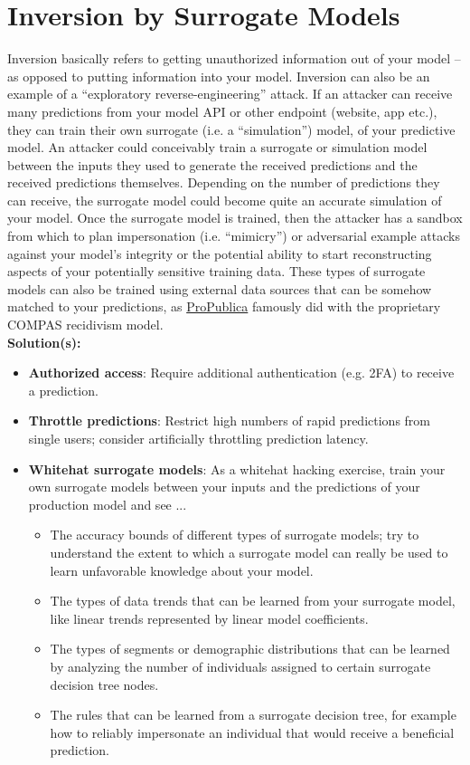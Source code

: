 \documentclass[fleqn]{article}
\begin{document}
\section{Inversion by Surrogate Models} \label{sec:inv}

Inversion basically refers to getting unauthorized information out of your model -- as opposed to putting information into your model. Inversion can also be an example of a ``exploratory reverse-engineering'' attack. If an attacker can receive many predictions from your model API or other endpoint (website, app etc.), they can train their own surrogate (i.e. a ``simulation'') model, of your predictive model. An attacker could conceivably train a surrogate or simulation model between the inputs they used to generate the received predictions and the received predictions themselves. Depending on the number of predictions they can receive, the surrogate model could become quite an accurate simulation of your model. Once the surrogate model is trained, then the attacker has a sandbox from which to plan impersonation (i.e. ``mimicry'') or adversarial example attacks against your model's integrity or the potential ability to start reconstructing aspects of your potentially sensitive training data. These types of surrogate models can also be trained using external data sources that can be somehow matched to your predictions, as \href{https://www.propublica.org/article/machine-bias-risk-assessments-in-criminal-sentencing}{ProPublica} famously did with the proprietary COMPAS recidivism model.\\

\noindent\textbf{Solution(s):}
\begin{itemize}
\item \textbf{Authorized access}: Require additional authentication (e.g. 2FA) to receive a prediction.
\item \textbf{Throttle predictions}: Restrict high numbers of rapid predictions from single users; consider artificially throttling prediction latency.
\item \textbf{Whitehat surrogate models}: As a whitehat hacking exercise, train your own surrogate models between your inputs and the predictions of your production model and see ...
	\begin{itemize}
	\item The accuracy bounds of different types of surrogate models; try to understand the extent to which a surrogate model can really be used to learn unfavorable knowledge about your model. 
	\item The types of data trends that can be learned from your surrogate model, like linear trends represented by linear model coefficients.
	\item The types of segments or demographic distributions that can be learned by analyzing the number of individuals assigned to certain surrogate decision tree nodes.
	\item The rules that can be learned from a surrogate decision tree, for example how to reliably impersonate an individual that would receive a beneficial prediction. 
	\end{itemize}
\end{itemize}
\end{document}
